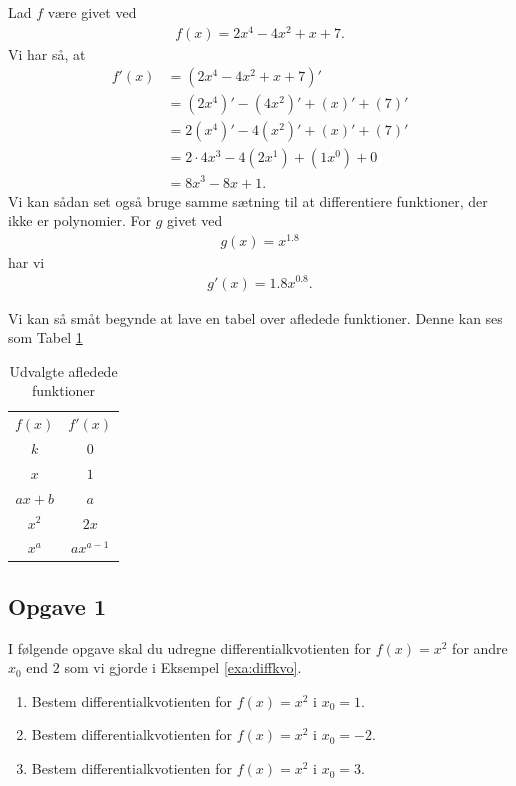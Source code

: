 \begin{exa}
	Lad $f$ være givet ved
	\begin{align*}
		f(x) = 2x^4 -4x^2 + x + 7.
	\end{align*}
	Vi har så, at 
	\begin{align*}
		f'(x) &= (2x^4-4x^2+x+7)' \\
		&= (2x^4)' - (4x^2)' + (x)' + (7)' \\
		&= 2(x^4)' - 4(x^2)' + (x)' + (7)' \\
		&= 2\cdot 4x^{3} - 4(2x^{1}) + (1x^{0}) + 0 \\
		&= 8x^3 -8x + 1.
	\end{align*}
	Vi kan sådan set også bruge samme sætning til at differentiere funktioner, der ikke er polynomier. For $g$
	givet ved
	\begin{align*}
		g(x) = x^{1.8}
	\end{align*}
	har vi 
	\begin{align*}
		g'(x) = 1.8x^{0.8}.
	\end{align*}
\end{exa}
Vi kan så småt begynde at lave en tabel over afledede funktioner. Denne kan ses som Tabel \ref{tab:afledt}
\begin{table}[H]
	\centering
	\begin{tabular}{cc}
		$f(x)$ & $f'(x)$ \\
		$k$ & $0$ \\
		$x$ & $1$ \\
		$ax + b$  & $a$ \\
		$x^2$ & $2x$ \\
		$x^a$ & $ax^{a-1} $
	\end{tabular}
	\caption{Udvalgte afledede funktioner}
	\label{tab:afledt}
\end{table}

\subsection*{Opgave 1}
I følgende opgave skal du udregne differentialkvotienten for $f(x) = x^2$ for andre $x_0$ end $2$ som vi gjorde i Eksempel \ref{exa:diffkvo}.
\begin{enumerate}[label=\roman*)]
	\item Bestem differentialkvotienten for $f(x) = x^2$ i $x_0 = 1$.
	\item Bestem differentialkvotienten for $f(x) = x^2$ i $x_0 = -2$.
	\item Bestem differentialkvotienten for $f(x) = x^2$ i $x_0 = 3$.
\end{enumerate}

